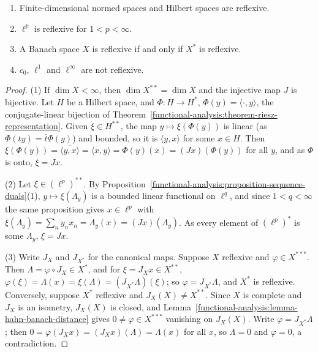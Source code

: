 \begin{proposition}\label{functional-analysis:proposition-reflexive-examples}
\begin{enumerate}
\item Finite-dimensional normed spaces and Hilbert spaces are reflexive.
\item $\ell^p$ is reflexive for $1 < p < \infty$.
\item A Banach space $X$ is reflexive if and only if $X^*$ is reflexive.
\item $c_0$, $\ell^1$ and $\ell^\infty$ are not reflexive.
\end{enumerate}
\end{proposition}

\begin{proof}
(1) If $\dim X < \infty$, then $\dim X^{**} = \dim X$ and the injective map $J$ is bijective. Let $H$ be a Hilbert space, and $\Phi \colon H \to H^*$, $\Phi(y) = \langle \cdot, y \rangle$, the conjugate-linear
bijection of Theorem~\ref{functional-analysis:theorem-riesz-representation}. Given $\xi \in H^{**}$, the map $y \mapsto \overline{\xi(\Phi(y))}$ is linear (as $\Phi(ty) = \bar t\Phi(y)$) and bounded, so it is
$\langle y, x \rangle$ for some $x \in H$. Then $\xi(\Phi(y)) = \overline{\langle y, x \rangle} = \langle x, y \rangle = \Phi(y)(x) = (Jx)(\Phi(y))$ for all $y$, and as $\Phi$ is onto, $\xi = Jx$.

(2) Let $\xi \in (\ell^p)^{**}$. By Proposition~\ref{functional-analysis:proposition-sequence-duals}(1), $y \mapsto \xi(\Lambda_y)$ is a bounded linear functional on $\ell^q$, and since $1 < q < \infty$ the same proposition
gives $x \in \ell^p$ with $\xi(\Lambda_y) = \sum_ny_nx_n = \Lambda_y(x) = (Jx)(\Lambda_y)$. As every element of $(\ell^p)^*$ is some $\Lambda_y$, $\xi = Jx$.

(3) Write $J_X$ and $J_{X^*}$ for the canonical maps. Suppose $X$ reflexive and $\varphi \in X^{***}$. Then $\Lambda = \varphi \circ J_X \in X^*$, and for $\xi = J_Xx \in X^{**}$,
$\varphi(\xi) = \Lambda(x) = \xi(\Lambda) = (J_{X^*}\Lambda)(\xi)$; so $\varphi = J_{X^*}\Lambda$, and $X^*$ is reflexive. Conversely, suppose $X^*$ reflexive and $J_X(X) \neq X^{**}$. Since $X$ is complete and
$J_X$ is an isometry, $J_X(X)$ is closed, and Lemma~\ref{functional-analysis:lemma-hahn-banach-distance} gives $0 \neq \varphi \in X^{***}$ vanishing on $J_X(X)$. Write $\varphi = J_{X^*}\Lambda$; then
$0 = \varphi(J_Xx) = (J_Xx)(\Lambda) = \Lambda(x)$ for all $x$, so $\Lambda = 0$ and $\varphi = 0$, a contradiction.


\end{proof}
